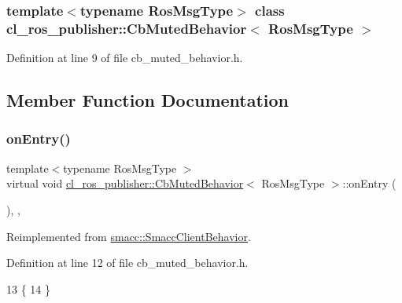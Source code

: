 \subsubsection*{template$<$typename Ros\+Msg\+Type$>$\newline
class cl\+\_\+ros\+\_\+publisher\+::\+Cb\+Muted\+Behavior$<$ Ros\+Msg\+Type $>$}



Definition at line 9 of file cb\+\_\+muted\+\_\+behavior.\+h.



\subsection{Member Function Documentation}
\mbox{\label{classcl__ros__publisher_1_1CbMutedBehavior_a79376d9160e3bd44678a2c0d89f1b4de}} 
\subsubsection{\texorpdfstring{on\+Entry()}{onEntry()}}
{\footnotesize\ttfamily template$<$typename Ros\+Msg\+Type $>$ \\
virtual void \hyperlink{classcl__ros__publisher_1_1CbMutedBehavior}{cl\+\_\+ros\+\_\+publisher\+::\+Cb\+Muted\+Behavior}$<$ Ros\+Msg\+Type $>$\+::on\+Entry (\begin{DoxyParamCaption}{ }\end{DoxyParamCaption})\hspace{0.3cm}{\ttfamily [inline]}, {\ttfamily [override]}, {\ttfamily [virtual]}}



Reimplemented from \hyperlink{classsmacc_1_1SmaccClientBehavior_ad5d3e1f1697c3cfe66c94cadba948493}{smacc\+::\+Smacc\+Client\+Behavior}.



Definition at line 12 of file cb\+\_\+muted\+\_\+behavior.\+h.


\begin{DoxyCode}
13     \{
14     \}
\end{DoxyCode}
\mbox{\label{classcl__ros__publisher_1_1CbMutedBehavior_a4c02187c58358fa811777d9956510222}} 

